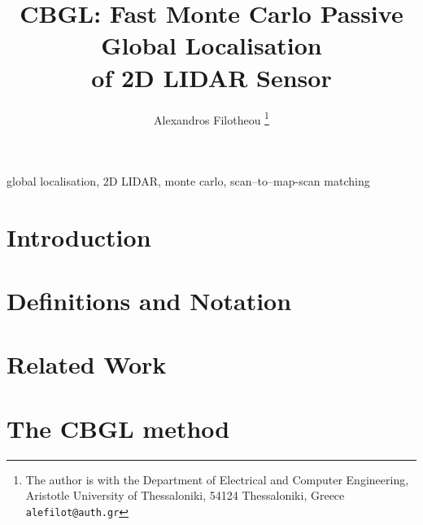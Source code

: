 \documentclass[letterpaper, 10 pt, conference]{ieeeconf}
\begin{document}
\title{\LARGE \bf CBGL: Fast Monte Carlo Passive Global Localisation \\ of 2D LIDAR Sensor}

\author{Alexandros Filotheou%
 \thanks{The author is with the Department of Electrical and Computer Engineering,
  Aristotle University of Thessaloniki, 54124 Thessaloniki, Greece  {\tt\small alefilot@auth.gr}}%
}

\maketitle
\thispagestyle{empty}
\pagestyle{empty}

\begin{abstract}
  
\end{abstract}

\begin{keywords}
global localisation, 2D LIDAR, monte carlo, scan--to--map-scan matching
\end{keywords}

\section{Introduction}
  

\section{Definitions and Notation}
  \label{section:definitions}
  

\section{Related Work}
  \label{section:sota}
  

\section{The CBGL method}
  \label{section:the_proposed_method}
  
\end{document}
